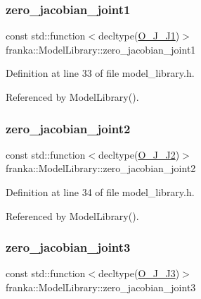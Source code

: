 \subsubsection{\texorpdfstring{zero\+\_\+jacobian\+\_\+joint1}{zero\_jacobian\_joint1}}
{\footnotesize\ttfamily const std\+::function$<$decltype(\hyperlink{libfcimodels_8h_a2891907d1cd8adbbd0d3cab6364943cc}{O\+\_\+\+J\+\_\+\+J1})$>$ franka\+::\+Model\+Library\+::zero\+\_\+jacobian\+\_\+joint1}



Definition at line 33 of file model\+\_\+library.\+h.



Referenced by Model\+Library().

\mbox{\label{classfranka_1_1ModelLibrary_a5c4cb558fb449e654c4f112e7eb60d2f}} 
\subsubsection{\texorpdfstring{zero\+\_\+jacobian\+\_\+joint2}{zero\_jacobian\_joint2}}
{\footnotesize\ttfamily const std\+::function$<$decltype(\hyperlink{libfcimodels_8h_a08ca89634efba16d0f63c674838edf23}{O\+\_\+\+J\+\_\+\+J2})$>$ franka\+::\+Model\+Library\+::zero\+\_\+jacobian\+\_\+joint2}



Definition at line 34 of file model\+\_\+library.\+h.



Referenced by Model\+Library().

\mbox{\label{classfranka_1_1ModelLibrary_a42e9a54673e2cf9a335834401ce3debc}} 
\subsubsection{\texorpdfstring{zero\+\_\+jacobian\+\_\+joint3}{zero\_jacobian\_joint3}}
{\footnotesize\ttfamily const std\+::function$<$decltype(\hyperlink{libfcimodels_8h_a771fe182b2784deb41ec785d52831f2f}{O\+\_\+\+J\+\_\+\+J3})$>$ franka\+::\+Model\+Library\+::zero\+\_\+jacobian\+\_\+joint3}



